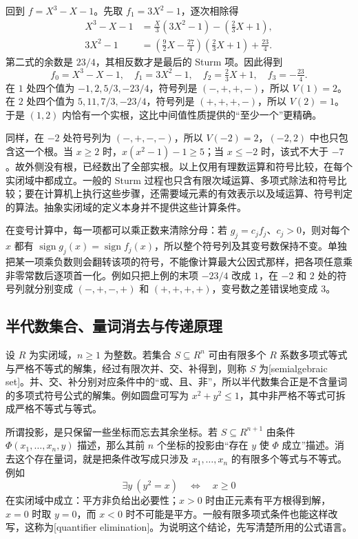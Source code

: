 \ProseParagraphBreak
回到 \(f=X^3-X-1\)。先取 \(f_1=3X^2-1\)，逐次相除得
\[
	\begin{aligned}
		X^3-X-1&=\frac X3(3X^2-1)-\left(\frac23X+1\right),\\
		3X^2-1&=\left(\frac92X-\frac{27}4\right) \left(\frac23X+1\right)+\frac{23}4.
	\end{aligned}
\]
第二式的余数是 \(23/4\)，其相反数才是最后的 Sturm 项。因此得到
\[
	f_0=X^3-X-1,\quad f_1=3X^2-1,\quad f_2=\tfrac23X+1,\quad f_3=-\tfrac{23}{4}.
\]
在 \(1\) 处四个值为 \(-1,2,5/3,-23/4\)，符号列是 \((-,+,+,-)\)，所以 \(V(1)=2\)。在 \(2\) 处四个值为 \(5,11,7/3,-23/4\)，符号列是 \((+,+,+,-)\)，所以 \(V(2)=1\)。于是 \((1,2)\) 内恰有一个实根，这比中间值性质提供的“至少一个”更精确。

\ProseParagraphBreak
同样，在 \(-2\) 处符号列为 \((-,+,-,-)\)，所以 \(V(-2)=2\)，\((-2,2)\) 中也只包含这一个根。当 \(x\geq2\) 时，\(x(x^2-1)-1\geq5\)；当 \(x\leq-2\) 时，该式不大于 \(-7\)。故外侧没有根，已经数出了全部实根。以上仅用有理数运算和符号比较，在每个实闭域中都成立。一般的 Sturm 过程也只含有限次域运算、多项式除法和符号比较；要在计算机上执行这些步骤，还需要域元素的有效表示以及域运算、符号判定的算法。抽象实闭域的定义本身并不提供这些计算条件。

\ProseParagraphBreak
在变号计算中，每一项都可以乘正数来清除分母：若 \(g_j=c_jf_j\)、\(c_j>0\)，则对每个 \(x\) 都有 \(\operatorname{sign}g_j(x)=\operatorname{sign}f_j(x)\)，所以整个符号列及其变号数保持不变。单独把某一项乘负数则会翻转该项的符号，不能像计算最大公因式那样，把各项任意乘非零常数后逐项首一化。例如只把上例的末项 \(-23/4\) 改成 \(1\)，在 \(-2\) 和 \(2\) 处的符号列就分别变成 \((-,+,-,+)\) 和 \((+,+,+,+)\)，变号数之差错误地变成 \(3\)。

\subsection{半代数集合、量词消去与传递原理}
\label{b1:subsec:E03:02}

设 \(R\) 为实闭域，\(n\geq1\) 为整数。若集合 \(S\subseteq R^n\) 可由有限多个 \(R\) 系数多项式等式与严格不等式的解集，经过有限次并、交、补得到，则称 \(S\) 为[semialgebraic set]。并、交、补分别对应条件中的“或、且、非”，所以半代数集合正是不含量词的多项式符号公式的解集。例如圆盘可写为 \(x^2+y^2\leq1\)，其中非严格不等式可拆成严格不等式与等式。

\ProseParagraphBreak
所谓投影，是只保留一些坐标而忘去其余坐标。若 \(S\subseteq R^{n+1}\) 由条件 \(\Phi(x_1,\ldots,x_n,y)\) 描述，那么其前 \(n\) 个坐标的投影由“存在 \(y\) 使 \(\Phi\) 成立”描述。消去这个存在量词，就是把条件改写成只涉及 \(x_1,\ldots,x_n\) 的有限多个等式与不等式。例如
\[
	\exists y\ (y^2=x)\quad\Longleftrightarrow\quad x\geq0
\]
在实闭域中成立：平方非负给出必要性；\(x>0\) 时由正元素有平方根得到解，\(x=0\) 时取 \(y=0\)，而 \(x<0\) 时不可能是平方。一般有限多项式条件也能这样改写，这称为[quantifier elimination]。为说明这个结论，先写清楚所用的公式语言。

